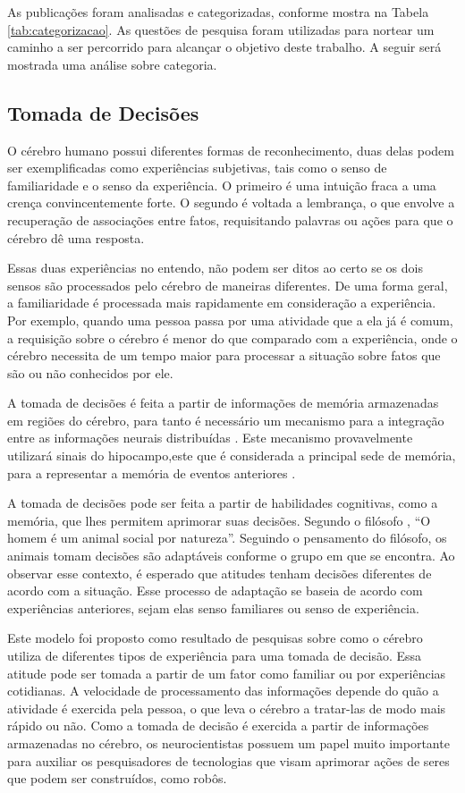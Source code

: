 As publicações foram analisadas e categorizadas, conforme mostra na Tabela \ref{tab:categorizacao}. As questões de pesquisa foram utilizadas para nortear um caminho a ser percorrido para alcançar o objetivo deste trabalho. A seguir será mostrada uma análise sobre categoria.

\subsection{Tomada de Decisões}

O cérebro humano possui diferentes formas de reconhecimento, duas delas podem ser exemplificadas como experiências subjetivas, tais como o senso de familiaridade e o senso da experiência. O primeiro é uma intuição fraca a uma crença convincentemente forte. O segundo é voltada a lembrança, o que envolve a recuperação de associações entre fatos, requisitando palavras ou ações para que o cérebro dê uma resposta.

Essas duas experiências no entendo, não podem ser ditos ao certo se os dois sensos são processados pelo cérebro de maneiras diferentes. De uma forma geral, a familiaridade é processada mais rapidamente em consideração a experiência. Por exemplo, quando uma pessoa passa por uma atividade que a ela já é comum, a requisição sobre o cérebro é menor do que comparado com a experiência, onde o cérebro necessita de um tempo maior para processar a situação sobre fatos que são ou não conhecidos por ele. 

A tomada de decisões é feita a partir de informações de memória armazenadas em regiões do cérebro, para tanto é necessário um mecanismo para a integração entre as informações neurais distribuídas \cite{buzsaki}. Este mecanismo provavelmente utilizará sinais do hipocampo,este que é considerada a principal sede de memória, para a representar a memória de eventos anteriores \cite{eichenbaum}.

A tomada de decisões pode ser feita a partir de habilidades cognitivas, como a memória, que lhes permitem aprimorar suas decisões. Segundo o filósofo \cite{aristoteles}, “O homem é um animal social por natureza”. Seguindo o pensamento do filósofo, os animais tomam decisões são adaptáveis conforme o grupo em que se encontra. Ao observar esse contexto, é esperado que atitudes tenham decisões diferentes de acordo com a situação. Esse processo de adaptação se baseia de acordo com experiências anteriores, sejam elas senso familiares ou senso de experiência.

Este modelo foi proposto como resultado de pesquisas sobre como o cérebro utiliza de diferentes tipos de experiência para uma tomada de decisão. Essa atitude pode ser tomada a partir de um fator como familiar ou por experiências cotidianas. A velocidade de processamento das informações depende do quão a atividade é exercida pela pessoa, o que leva o cérebro a tratar-las de modo mais rápido ou não. Como a tomada de decisão é exercida a partir de informações armazenadas no cérebro, os neurocientistas possuem um papel muito importante para auxiliar os pesquisadores de tecnologias que visam aprimorar ações de seres que podem ser construídos, como robôs.

